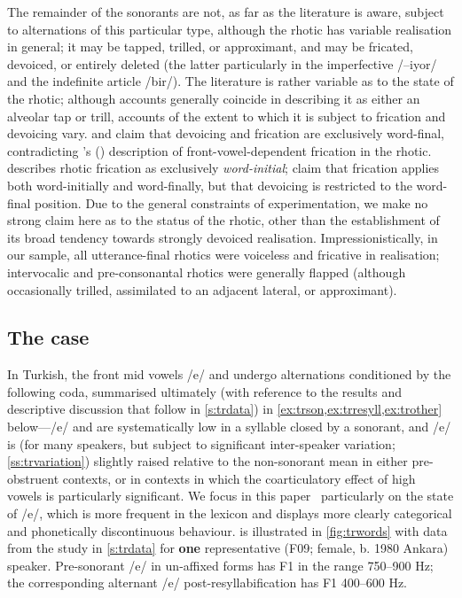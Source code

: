 The remainder of the sonorants are not, as far as the literature is aware, subject to alternations of this particular type, although the rhotic has variable realisation in general; it may be tapped, trilled, or approximant, and may be fricated, devoiced, or entirely deleted (the latter particularly in the imperfective /–iyor/ and the indefinite article /bir/). The literature is rather variable as to the state of the rhotic; although accounts generally coincide \citep{Lewis1967,Goksel2005} in describing it as either an alveolar tap or trill, accounts of the extent to which it is subject to frication and devoicing vary. \citet[p.~7]{Lewis1967} and \citet[p.~29]{Kopkalli1993} claim that devoicing and frication are exclusively word-final, contradicting \citeauthor{Blaskovics1964}'s (\citeyear[p.~5–10]{Blaskovics1964}) description of front-vowel-dependent frication in the rhotic. \cite{Comrie1997Tr} describes rhotic frication as exclusively \emph{word-initial}; \citet[p.~25]{Yavuz2011} claim that frication applies both word-initially and word-finally, but that devoicing is restricted to the word-final position. Due to the general constraints of experimentation, we make no strong claim here as to the status of the rhotic, other than the establishment of its broad tendency towards strongly devoiced realisation. Impressionistically, in our sample, all utterance-final rhotics were voiceless and fricative in realisation; intervocalic and pre-consonantal rhotics were generally flapped (although occasionally trilled, assimilated to an adjacent lateral, or approximant).

\subsection{The case}\label{ss:trcase}

In Turkish, the front mid vowels /e/ and \ur{\o} undergo alternations conditioned by the following coda, summarised ultimately (with reference to the results and descriptive discussion that follow in \cref{s:trdata}) in \cref{ex:trson,ex:trresyll,ex:trother} below---/e/ and \ur{\o} are systematically low in a syllable closed by a sonorant, and /e/ is (for many speakers, but subject to significant inter-speaker variation; \cref{ss:trvariation}) slightly raised relative to the non-sonorant mean in either pre-obstruent contexts, or in contexts in which the coarticulatory effect of high vowels is particularly significant. We focus in this paper \ particularly on the state of /e/, which is more frequent in the lexicon and displays more clearly categorical and phonetically discontinuous behaviour.  is illustrated in \cref{fig:trwords} with data from the study in \cref{s:trdata} for \textbf{one} representative (F09; female, b. 1980 Ankara) speaker. Pre-sonorant /e/ in un-affixed forms has F1 in the range 750–900 Hz; the corresponding alternant /e/ post-resyllabification has F1 400–600 Hz.

